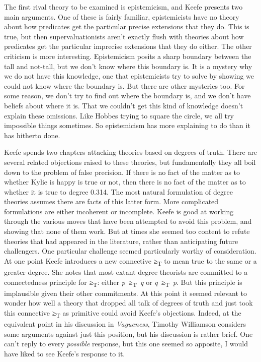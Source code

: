 \documentclass[
  10pt,
  letterpaper,
  DIV=11,
  numbers=noendperiod,
  twoside]{scrartcl}
\begin{document}
The first rival theory to be examined is epistemicism, and Keefe
presents two main arguments. One of these is fairly familiar,
epistemicists have no theory about how predicates get the particular
precise extensions that they do. This is true, but then
supervaluationists aren't exactly flush with theories about how
predicates get the particular imprecise extensions that they do either.
The other criticism is more interesting. Epistemicism posits a sharp
boundary between the tall and not-tall, but we don't know where this
boundary is. It is a mystery why we do not have this knowledge, one that
epistemicists try to solve by showing we could not know where the
boundary is. But there are other mysteries too. For some reason, we
don't try to find out where the boundary is, and we don't have beliefs
about where it is. That we couldn't get this kind of knowledge doesn't
explain these omissions. Like Hobbes trying to square the circle, we all
try impossible things sometimes. So epistemicism has more explaining to
do than it has hitherto done.

Keefe spends two chapters attacking theories based on degrees of truth.
There are several related objections raised to these theories, but
fundamentally they all boil down to the problem of false precision. If
there is no fact of the matter as to whether Kylie is happy is true or
not, then there is no fact of the matter as to whether it is true to
degree 0.314. The most natural formulation of degree theories assumes
there are facts of this latter form. More complicated formulations are
either incoherent or incomplete. Keefe is good at working through the
various moves that have been attempted to avoid this problem, and
showing that none of them work. But at times she seemed too content to
refute theories that had appeared in the literature, rather than
anticipating future challengers. One particular challenge seemed
particularly worthy of consideration. At one point Keefe introduces a
new connective ≥\textsubscript{T} to mean true to the same or a greater
degree. She notes that most extant degree theorists are committed to a
connectedness principle for ≥\textsubscript{T}: either
\emph{p}~≥\textsubscript{T}~\emph{q} or
\emph{q}~≥\textsubscript{T}~\emph{p}. But this principle is implausible
given their other commitments. At this point it seemed relevant to
wonder how well a theory that dropped all talk of degrees of truth and
just took this connective ≥\textsubscript{T} as primitive could avoid
Keefe's objections. Indeed, at the equivalent point in his discussion in
\emph{Vagueness}, Timothy Williamson considers some arguments against
just this position, but his discussion is rather brief. One can't reply
to every \emph{possible} response, but this one seemed so apposite, I
would have liked to see Keefe's response to it.
\end{document}
